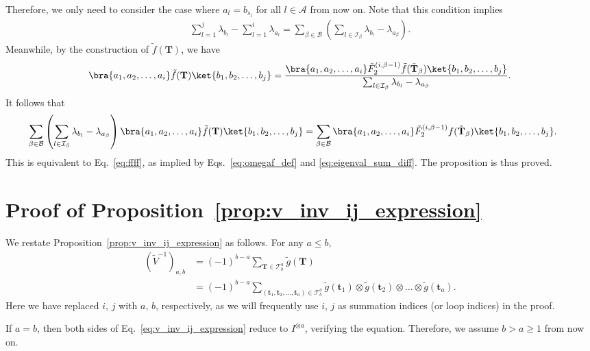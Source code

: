 \documentclass[superscriptaddress,onecolumn,nofootinbib,longbibliography,a4paper,accepted=2026-09-29]{quantumarticle}
\theoremstyle{plain}
\theoremstyle{definition}
\numberwithin{thm}{section}
\numberwithin{assumption}{section}
\numberwithin{lemma}{section}
\numberwithin{prop}{section}
\numberwithin{cor}{section}
\numberwithin{definition}{section}
\numberwithin{rmk}{section}
\numberwithin{equation}{section}
\newcommand{\lrb}[1]{\left ( #1 \right )}
\newcommand{\mbt}{\mathbf{t}}
\newcommand{\mbf}{\mathbf{T}}
\begin{document}
Therefore, we only need to consider the case where $a_l=b_{s_l}$ for all $l \in \mathcal{A}$ from now on. Note that this condition implies 
\begin{align}
\sum_{l=1}^j \lambda_{b_l} - \sum_{l=1}^i \lambda_{a_l} 
=\sum_{\beta \in \mathcal{B}} \lrb{\sum_{l \in \mathcal{I}_\beta} \lambda_{b_l}-\lambda_{a_\beta}}.
\label{eq:eigenval_sum_diff}
\end{align}
Meanwhile, by the construction of $\tilde{f}(\mbf)$, we have
\begin{align}
\bra{a_1,a_2,\dots, a_i} \tilde{f}(\mbf) \ket{b_1,b_2,\dots,b_j}
= \frac{\bra{a_1,a_2,\dots, a_i} \tilde{F}_2^{(i, \beta-1)} \tilde{f}(\tilde{\mbf}_{\beta}) \ket{b_1,b_2,\dots,b_j}}{\sum_{l \in \mathcal{I}_\beta} \lambda_{b_l} - \lambda_{a_\beta}}.
\end{align}
It follows that
\begin{align}
\hspace{-15pt} 
\sum_{\beta \in \mathcal{B}} \lrb{\sum_{l \in \mathcal{I}_\beta} \lambda_{b_l} - \lambda_{a_\beta} }
\bra{a_1,a_2,\dots, a_i} \tilde{f}(\mbf) \ket{b_1,b_2,\dots,b_j}=\sum_{\beta \in \mathcal{B}}
    \bra{a_1,a_2,\dots, a_i} \tilde{F}_2^{(i, \beta-1)} f(\tilde{\mbf}_{\beta}) \ket{b_1,b_2,\dots,b_j}.
\end{align}
This is equivalent to Eq.~\eqref{eq:ffff}, as implied by Eqs.~\eqref{eq:omegaf_def} and \eqref{eq:eigenval_sum_diff}. The proposition is thus proved.


\section{Proof of Proposition~\ref{prop:v_inv_ij_expression}}
\label{app:proof_lemma_v_inv_ij_expression}

We restate Proposition~\ref{prop:v_inv_ij_expression} as follows. For any $a \le b$, 
\begin{align}
(\tilde{V}^{-1})_{a,b} &= (-1)^{b-a} \sum_{\mbf \in \mathcal{T}^a_b} \tilde{g}(\mbf)\\
&=(-1)^{b-a} \sum_{(\mbt_1,\mbt_2,\dots,\mbt_a) \in \mathcal{T}^a_b} \tilde{g}(\mbt_1) \otimes \tilde{g}(\mbt_2) \otimes \dots \otimes \tilde{g}(\mbt_a).    
\label{eq:v_inv_ij_expression}
\end{align}
Here we have replaced $i$, $j$ with $a$, $b$, respectively, as we will frequently use $i$, $j$ as summation indices (or loop indices) in the proof.


If $a=b$, then both sides of Eq.~\eqref{eq:v_inv_ij_expression} reduce to $I^{\otimes a}$, verifying the equation. Therefore, we assume $b > a \ge 1$ from now on.
\end{document}
